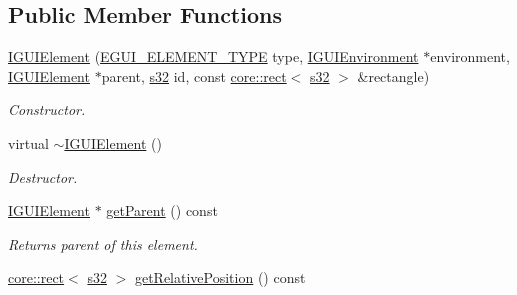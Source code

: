 \subsection*{Public Member Functions}
\begin{DoxyCompactItemize}
\item 
\mbox{\label{classirr_1_1gui_1_1IGUIElement_a540fb9b2617696ef421d5510b4d96fea}} 
\hyperlink{classirr_1_1gui_1_1IGUIElement_a540fb9b2617696ef421d5510b4d96fea}{I\+G\+U\+I\+Element} (\hyperlink{namespaceirr_1_1gui_ae4d66df0ecf4117cdbcf9f22404bd254}{E\+G\+U\+I\+\_\+\+E\+L\+E\+M\+E\+N\+T\+\_\+\+T\+Y\+PE} type, \hyperlink{classirr_1_1gui_1_1IGUIEnvironment}{I\+G\+U\+I\+Environment} $\ast$environment, \hyperlink{classirr_1_1gui_1_1IGUIElement}{I\+G\+U\+I\+Element} $\ast$parent, \hyperlink{namespaceirr_ac66849b7a6ed16e30ebede579f9b47c6}{s32} id, const \hyperlink{classirr_1_1core_1_1rect}{core\+::rect}$<$ \hyperlink{namespaceirr_ac66849b7a6ed16e30ebede579f9b47c6}{s32} $>$ \&rectangle)
\begin{DoxyCompactList}\small\item\em Constructor. \end{DoxyCompactList}\item 
\mbox{\label{classirr_1_1gui_1_1IGUIElement_a062e6704aa29ed50c22179ad268d8f48}} 
virtual \hyperlink{classirr_1_1gui_1_1IGUIElement_a062e6704aa29ed50c22179ad268d8f48}{$\sim$\+I\+G\+U\+I\+Element} ()
\begin{DoxyCompactList}\small\item\em Destructor. \end{DoxyCompactList}\item 
\mbox{\label{classirr_1_1gui_1_1IGUIElement_ab3eacf3540cb5b020f3c4a24c6a67473}} 
\hyperlink{classirr_1_1gui_1_1IGUIElement}{I\+G\+U\+I\+Element} $\ast$ \hyperlink{classirr_1_1gui_1_1IGUIElement_ab3eacf3540cb5b020f3c4a24c6a67473}{get\+Parent} () const
\begin{DoxyCompactList}\small\item\em Returns parent of this element. \end{DoxyCompactList}\item 
\mbox{\label{classirr_1_1gui_1_1IGUIElement_a056c893bcfe330c9c6058b6027a45cef}} 
\hyperlink{classirr_1_1core_1_1rect}{core\+::rect}$<$ \hyperlink{namespaceirr_ac66849b7a6ed16e30ebede579f9b47c6}{s32} $>$ \hyperlink{classirr_1_1gui_1_1IGUIElement_a056c893bcfe330c9c6058b6027a45cef}{get\+Relative\+Position} () const

\end{DoxyCompactItemize}
